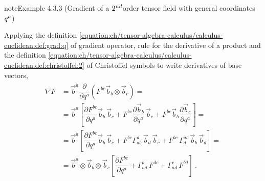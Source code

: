 \documentclass[letterpaper,10pt,english]{jupyterBook}
\begin{document}
\begin{sphinxadmonition}{note}{Example 4.3.3 (Gradient of a \protect\(2^{nd}\protect\)\sphinxhyphen{}order tensor field \sphinxhyphen{} with general coordinates \protect\(q^{a}\protect\))}



\sphinxAtStartPar
Applying the definition \eqref{equation:ch/tensor-algebra-calculus/calculus-euclidean:def:grad:q} of gradient operator, rule for the derivative of a product and the definition \eqref{equation:ch/tensor-algebra-calculus/calculus-euclidean:def:christoffel:2} of Christoffel symbols to write derivatives of base vectors,
\begin{equation*}
\begin{split}\begin{aligned}
  \nabla F 
  & = \vec{b}^a \dfrac{\partial}{\partial q^a} \left( F^{bc} \vec{b}_b \otimes \vec{b}_c \right) = \\
  & = \vec{b}^a \left[ \dfrac{\partial F^{bc}}{\partial q^a} \vec{b}_b \, \vec{b}_c + F^{bc} \dfrac{\partial \vec{b}_b}{\partial q^a} \, \vec{b}_c + F^{bc} \vec{b}_b \dfrac{\partial \vec{b}_c}{\partial q^a} \right] = \\
  & = \vec{b}^a \left[ \dfrac{\partial F^{bc}}{\partial q^a} \vec{b}_b \, \vec{b}_c + F^{bc} \Gamma_{ab}^d \, \vec{b}_d \, \vec{b}_c + F^{bc} \, \Gamma_{d}^{ac} \, \vec{b}_b \, \vec{b}_d \right] = \\
  & = \vec{b}^a \otimes \vec{b}_b \otimes \vec{b}_c \left[ \dfrac{\partial F^{bc}}{\partial q^a} + \Gamma_{ad}^b \, F^{dc} + \Gamma^{c}_{ad} \, F^{bd}  \right] \ .
\end{aligned}\end{split}
\end{equation*}\end{sphinxadmonition}
\end{document}
